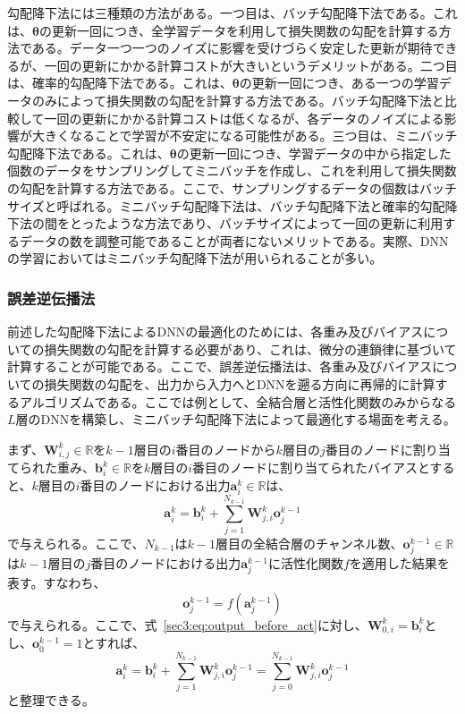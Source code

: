 \documentclass[12pt]{jarticle}
\numberwithin{equation}{section}    %
\numberwithin{figure}{section}      %
\numberwithin{table}{section}      %
\begin{document}
勾配降下法には三種類の方法がある。一つ目は、バッチ勾配降下法である。これは、$\bm{\theta}$の更新一回につき、全学習データを利用して損失関数の勾配を計算する方法である。データ一つ一つのノイズに影響を受けづらく安定した更新が期待できるが、一回の更新にかかる計算コストが大きいというデメリットがある。二つ目は、確率的勾配降下法である。これは、$\bm{\theta}$の更新一回につき、ある一つの学習データのみによって損失関数の勾配を計算する方法である。バッチ勾配降下法と比較して一回の更新にかかる計算コストは低くなるが、各データのノイズによる影響が大きくなることで学習が不安定になる可能性がある。三つ目は、ミニバッチ勾配降下法である。これは、$\bm{\theta}$の更新一回につき、学習データの中から指定した個数のデータをサンプリングしてミニバッチを作成し、これを利用して損失関数の勾配を計算する方法である。ここで、サンプリングするデータの個数はバッチサイズと呼ばれる。ミニバッチ勾配降下法は、バッチ勾配降下法と確率的勾配降下法の間をとったような方法であり、バッチサイズによって一回の更新に利用するデータの数を調整可能であることが両者にないメリットである。実際、DNNの学習においてはミニバッチ勾配降下法が用いられることが多い。

\subsubsection{誤差逆伝播法}
\label{sec3:sec:backpropagation}
前述した勾配降下法によるDNNの最適化のためには、各重み及びバイアスについての損失関数の勾配を計算する必要があり、これは、微分の連鎖律に基づいて計算することが可能である。ここで、誤差逆伝播法は、各重み及びバイアスについての損失関数の勾配を、出力から入力へとDNNを遡る方向に再帰的に計算するアルゴリズムである。ここでは例として、全結合層と活性化関数のみからなる$L$層のDNNを構築し、ミニバッチ勾配降下法によって最適化する場面を考える。

まず、$\bm{W}_{i, j}^{k} \in \mathbb{R}$を$k - 1$層目の$i$番目のノードから$k$層目の$j$番目のノードに割り当てられた重み、$\bm{b}_{i}^{k} \in \mathbb{R}$を$k$層目の$i$番目のノードに割り当てられたバイアスとすると、$k$層目の$i$番目のノードにおける出力$\bm{a}_{i}^{k} \in \mathbb{R}$は、
\begin{equation}
    \label{sec3:eq:output_before_act}
    \bm{a}_{i}^{k} = \bm{b}_{i}^{k} + \sum_{j = 1}^{N_{k - 1}} \bm{W}_{j, i}^{k} \bm{o}_{j}^{k - 1}
\end{equation}
で与えられる。ここで、$N_{k - 1}$は$k - 1$層目の全結合層のチャンネル数、$\bm{o}_{j}^{k - 1} \in \mathbb{R}$は$k - 1$層目の$j$番目のノードにおける出力$\bm{a}_{j}^{k - 1}$に活性化関数$f$を適用した結果を表す。すなわち、
\begin{equation}
    \bm{o}_{j}^{k - 1} = f(\bm{a}_{j}^{k - 1})
\end{equation}
で与えられる。ここで、式~\eqref{sec3:eq:output_before_act}に対し、$\bm{W}_{0, i}^{k} = \bm{b}_{i}^{k}$とし、$\bm{o}_{0}^{k - 1} = 1$とすれば、
\begin{equation}
    \label{sec3:eq:output_before_act_2}
    \bm{a}_{i}^{k} = \bm{b}_{i}^{k} + \sum_{j = 1}^{N_{k - 1}} \bm{W}_{j, i}^{k} \bm{o}_{j}^{k - 1}
    = \sum_{j = 0}^{N_{k - 1}} \bm{W}_{j, i}^{k} \bm{o}_{j}^{k - 1}
\end{equation}
と整理できる。
\end{document}
